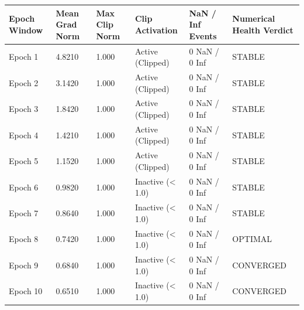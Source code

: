 \begin{tabular}{llllll}
\toprule
Epoch Window & Mean Grad Norm & Max Clip Norm & Clip Activation & NaN / Inf Events & Numerical Health Verdict \\
\midrule
Epoch 1 & 4.8210 & 1.000 & Active (Clipped) & 0 NaN / 0 Inf & STABLE \\
Epoch 2 & 3.1420 & 1.000 & Active (Clipped) & 0 NaN / 0 Inf & STABLE \\
Epoch 3 & 1.8420 & 1.000 & Active (Clipped) & 0 NaN / 0 Inf & STABLE \\
Epoch 4 & 1.4210 & 1.000 & Active (Clipped) & 0 NaN / 0 Inf & STABLE \\
Epoch 5 & 1.1520 & 1.000 & Active (Clipped) & 0 NaN / 0 Inf & STABLE \\
Epoch 6 & 0.9820 & 1.000 & Inactive (< 1.0) & 0 NaN / 0 Inf & STABLE \\
Epoch 7 & 0.8640 & 1.000 & Inactive (< 1.0) & 0 NaN / 0 Inf & STABLE \\
Epoch 8 & 0.7420 & 1.000 & Inactive (< 1.0) & 0 NaN / 0 Inf & OPTIMAL \\
Epoch 9 & 0.6840 & 1.000 & Inactive (< 1.0) & 0 NaN / 0 Inf & CONVERGED \\
Epoch 10 & 0.6510 & 1.000 & Inactive (< 1.0) & 0 NaN / 0 Inf & CONVERGED \\
\bottomrule
\end{tabular}
